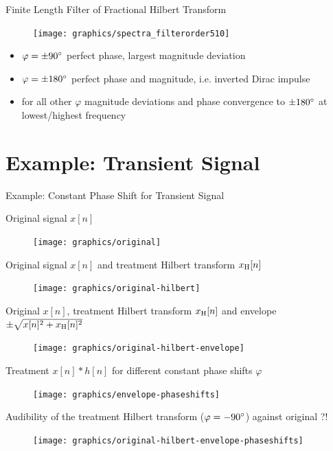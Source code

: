 \documentclass[mathserif]{intbeamer}
\begin{document}
%
%
%
\begin{frame}{Finite Length Filter of Fractional Hilbert Transform}
\begin{figure}
\texttt{[image: graphics/spectra\_filterorder510]}
\end{figure}

\begin{itemize}
\item $\varphi=\pm 90\degree$ perfect phase, largest magnitude deviation
\item $\varphi=\pm 180\degree$ perfect phase and magnitude, i.e. inverted Dirac impulse
\item for all other $\varphi$ magnitude deviations and phase convergence to $\pm 180\degree$ at lowest/highest frequency
\end{itemize}
\end{frame}
%
%
%
\section{Example: Transient Signal}
\begin{frame}{Example: Constant Phase Shift for Transient Signal}
{
Original signal $x[n]$
\begin{figure}
\texttt{[image: graphics/original]}
\end{figure}
}
{
Original signal $x[n]$ and treatment Hilbert transform $x_{\mathrm{H}}[n]$
\begin{figure}
\texttt{[image: graphics/original-hilbert]}
\end{figure}
}
{
Original $x[n]$, treatment Hilbert transform $x_{\mathrm{H}}[n]$ and envelope
$\pm\sqrt{x[n]^2+x_{\mathrm{H}}[n]^2}$
\begin{figure}
\texttt{[image: graphics/original-hilbert-envelope]}
\end{figure}
}
{
Treatment $x[n]\ast h[n]$ for different constant phase shifts $\varphi$
\begin{figure}
\texttt{[image: graphics/envelope-phaseshifts]}
\end{figure}
}
{
Audibility of the treatment Hilbert transform ($\varphi=-90\degree$) against original ?!
\begin{figure}
\texttt{[image: graphics/original-hilbert-envelope-phaseshifts]}
\end{figure}
}
\end{frame}
%
%
%
\end{document}
